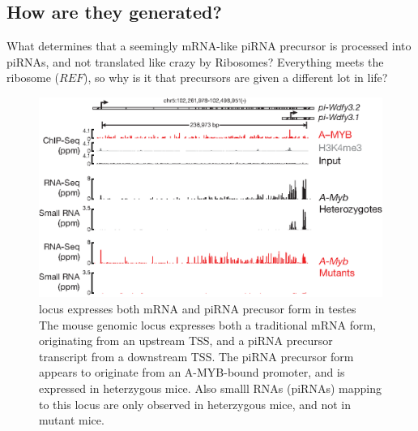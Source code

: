   \subsection{How are they generated?}


    What determines that a seemingly mRNA-like piRNA precursor is processed into piRNAs, and not translated like crazy by Ribosomes?  Everything meets the ribosome ($REF$), so why is it that precursors are given a different lot in life?

    \begin{figure}[htbp] %
      \centering 
      \includegraphics{Figures/Discussion/pi-wdfy3.eps}
      \caption[\wdfy{} locus expresses both mRNA and piRNA precusor form in testes]
      {\wdfy{} locus expresses both mRNA and piRNA precusor form in testes\\
        The mouse genomic locus \wdfy{} expresses both a traditional mRNA form, originating from an upstream TSS, and a piRNA precursor transcript from a downstream TSS. The piRNA precursor form appears to originate from an A-MYB-bound promoter, and is expressed in \amyb{} heterzygous mice. Also smalll RNAs (piRNAs) mapping to this locus are only observed in \amyb{} heterzygous mice, and not in \amyb{} mutant mice.
        }
      \label{fig:wdfy3}
      \end{figure}

